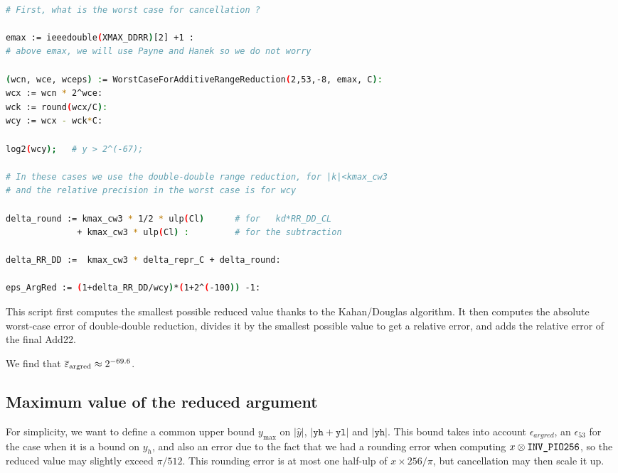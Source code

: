 \begin{lstlisting}[caption={Maple script computing the relative error bound of range reduction}, firstnumber=1,
  language={sh}, numbers=none]% of course it's maple
%Skip a line here, I don't know why, otherwise latex eats the first line

# First, what is the worst case for cancellation ?

emax := ieeedouble(XMAX_DDRR)[2] +1 :
# above emax, we will use Payne and Hanek so we do not worry

(wcn, wce, wceps) := WorstCaseForAdditiveRangeReduction(2,53,-8, emax, C):
wcx := wcn * 2^wce:
wck := round(wcx/C):
wcy := wcx - wck*C:

log2(wcy);   # y > 2^(-67);

# In these cases we use the double-double range reduction, for |k|<kmax_cw3
# and the relative precision in the worst case is for wcy

delta_round := kmax_cw3 * 1/2 * ulp(Cl)      # for   kd*RR_DD_CL
              + kmax_cw3 * ulp(Cl) :         # for the subtraction

delta_RR_DD :=  kmax_cw3 * delta_repr_C + delta_round:

eps_ArgRed := (1+delta_RR_DD/wcy)*(1+2^(-100)) -1:
\end{lstlisting}

This script first computes the smallest possible reduced value thanks
to the Kahan/Douglas algorithm. It then computes the absolute
worst-case error of double-double reduction, divides it by the
smallest possible value to get a relative error, and adds the relative
error of the final Add22.

 We find that
${\overline{\varepsilon}}_{\mathrm{argred}} \approx 2^{-69.6}$.


\subsection{Maximum value of the reduced argument
\label{sec:trigo:maxvalred}}

For simplicity, we want to define a common upper bound $y_{\max}$ on
$|\hat{y}|$, $|\mathtt{yh}+\mathtt{yl}|$ and $|\mathtt{yh}|$. This
bound takes into account $\epsilon_{argred}$, an $\epsilon_{53}$
for the case when it is a bound on $y_h$, and also an error due to the
fact that we had a rounding error when computing
$x\otimes\verb!INV_PIO256!$, so the reduced value may slightly exceed
$\pi/512$. This rounding error is at most one half-ulp of $x\times
256/\pi$, but cancellation may then scale it up.

